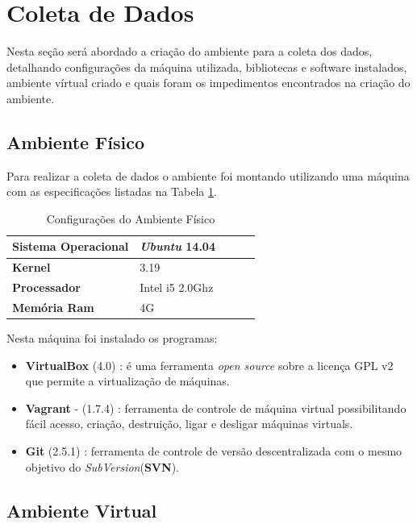 \section{Coleta de Dados}

Nesta seção será abordado a criação do ambiente para a coleta dos dados,
 detalhando configurações da máquina utilizada, bibliotecas e software instalados,
ambiente vírtual criado e quais foram os impedimentos encontrados na criação do ambiente.	

\subsection{Ambiente Físico}

	Para realizar a coleta de dados o ambiente foi montando
 utilizando uma máquina com as especificações listadas na Tabela
 \ref{configuracoes_ambiente_fisico}.

\begin{table}[h]
\centering
\begin{tabular}{lllll}
\textbf{Sistema Operacional} & \textit{Ubuntu} 14.04 \\ \toprule
\textbf{Kernel} & 3.19  \\ \midrule 
\textbf{Processador} & Intel i5 2.0Ghz \\ \midrule
\textbf{Memória Ram} & 4G  \\ \bottomrule 
\end{tabular} 
\caption{Configurações do Ambiente Físico}
\label{configuracoes_ambiente_fisico}
\end{table}


Nesta máquina foi instalado os programas:

\begin{itemize}
    \item \textbf{VirtualBox} (4.0) : é uma ferramenta \textit{open source} sobre a
 licença GPL v2 que permite a virtualização de máquinas.
    \item \textbf{Vagrant} - (1.7.4) : ferramenta de controle de
 máquina virtual possibilitando fácil acesso, criação, destruição, ligar e 
desligar máquinas virtuals.
    \item \textbf{Git} (2.5.1) : ferramenta de controle de versão descentralizada
com o mesmo objetivo do \textit{SubVersion}(\textbf{SVN}).
\end{itemize}

\subsection{Ambiente Virtual}

